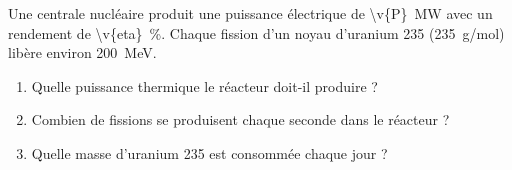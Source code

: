 Une centrale nucléaire produit une puissance électrique de \qty{\v{P}}{MW} avec un rendement de \qty{\v{eta}}{\percent}. Chaque fission d'un noyau d'uranium 235 (\qty{235}{g/mol}) libère environ \qty{200}{MeV}.

\begin{enumerate}[label=\alph*)]
    \item Quelle puissance thermique le réacteur doit-il produire ?
    \item Combien de fissions se produisent chaque seconde dans le réacteur ?
    \item Quelle masse d'uranium 235 est consommée chaque jour ?
\end{enumerate}
